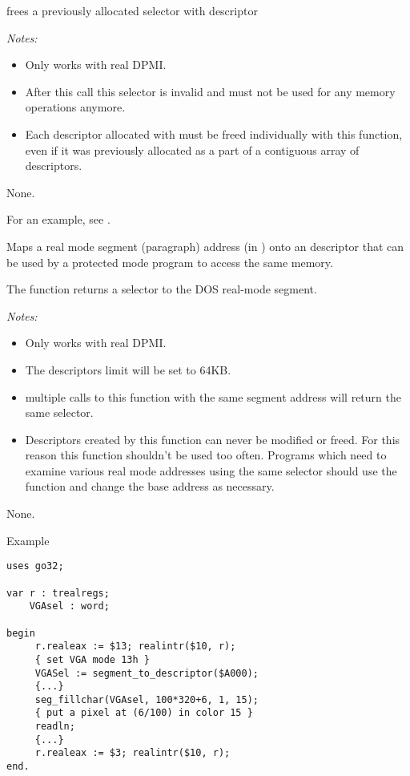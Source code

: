 {
 frees a previously allocated selector
with descriptor 

{\em Notes:}
\begin{itemize}
\item Only works with real DPMI.
\item After this call this selector is invalid and must not be used for any
memory operations anymore.
\item Each descriptor allocated with  must be 
freed
individually with this function, even if it was previously allocated as
a part of a contiguous array of descriptors.
\end{itemize}
}
{None.}
{}

For an example, see .

{ Maps a real mode segment (paragraph) address 
(in ) onto an descriptor that can be used by a protected mode 
program to access  the same memory.

The function returns a selector to the DOS real-mode segment.

{\em Notes:}
\begin{itemize}
\item Only works with real DPMI.
\item The descriptors limit will be set to 64KB.
\item multiple calls to this function with the same segment address will
  return the same selector.
\item Descriptors created by this function can never be modified or freed.
For this reason this function shouldn't be used too often. Programs
which need to examine various real mode addresses using the same
selector should use the function  and change
the base address as necessary.
\end{itemize}
}
{None.}
{}
\begin{FPCList}
\item[Example]
\begin{verbatim}
uses go32;

var r : trealregs;
    VGAsel : word;

begin
     r.realeax := $13; realintr($10, r); 
     { set VGA mode 13h }
     VGASel := segment_to_descriptor($A000);
     {...}
     seg_fillchar(VGAsel, 100*320+6, 1, 15); 
     { put a pixel at (6/100) in color 15 }
     readln;
     {...} 
     r.realeax := $3; realintr($10, r);
end.
\end{verbatim}
\end{FPCList}


